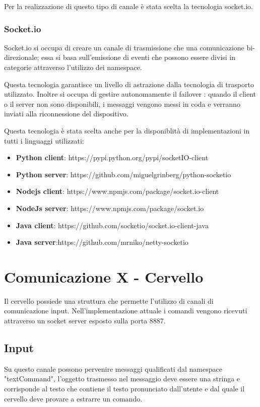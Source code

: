 \documentclass[twoside]{supsistudent}
\begin{document}
Per la realizzazione di questo tipo di canale è stata scelta la tecnologia socket.io. 
\subsection{Socket.io}
Socket.io si occupa di creare un canale di trasmissione che una comunicazione bi-direzionale; essa si basa sull'emissione di eventi che possono essere divisi in categorie attraverso l'utilizzo dei namespace.

Questa tecnologia garantisce un livello di astrazione dalla tecnologia di trasporto utilizzato. Inoltre si occupa di gestire autonomamente il failover : quando il client o il server non sono disponibili, i messaggi vengono messi in coda e verranno inviati alla riconnessione del dispositivo.

Questa tecnologia è stata scelta anche per la disponiblità di implementazioni in tutti i linguaggi utilizzati:
\begin{itemize}
	\item \textbf{Python client}: https://pypi.python.org/pypi/socketIO-client
	\item \textbf{Python server}: https://github.com/miguelgrinberg/python-socketio
	\item \textbf{Nodejs client}: https://www.npmjs.com/package/socket.io-client
	\item \textbf{NodeJs server}: https://www.npmjs.com/package/socket.io
	\item \textbf{Java client}: https://github.com/socketio/socket.io-client-java
	\item \textbf{Java server}:https://github.com/mrniko/netty-socketio
\end{itemize}

\chapter{Comunicazione X - Cervello }
Il cervello possiede una struttura che permette l'utilizzo di canali di comunicazione input. Nell'implementazione attuale i comandi vengono ricevuti attraverso un socket server esposto sulla porta 8887.
\section{Input}
Su questo canale possono pervenire messaggi qualificati dal namespace "textCommand", l'oggetto trasmesso nel messaggio deve essere una stringa e corrisponde al testo che contiene il testo pronunciato dall'utente e dal quale il cervello deve provare a estrarre un comando.
\end{document}
